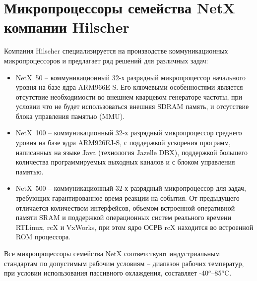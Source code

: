 \documentclass[a4paper,14pt,bachelor]{disser}
\begin{document}
\section{Микропроцессоры семейства NetX компании Hilscher}
Компания Hilscher специализируется на производстве коммуникационных микропроцессоров и предлагает ряд решений для различных задач:
\begin{itemize}
 \item NetX~50 -- коммуникационный 32-х разрядный микропроцессор начального уровня на базе ядра ARM966E-S. Его ключевыми особенностями является отсутствие необходимости во внешнем кварцевом генераторе частоты, при условии что не будет использоваться внешняя SDRAM память, и отсутствие блока управления памятью (MMU).
 \item NetX~100 -- коммуникационный 32-х разрядный микропроцессор среднего уровня на базе ядра ARM926EJ-S, с поддержкой ускорения программ, написанных на языке Java (технология Jazelle DBX), поддержкой большего количества программируемых выходных каналов и с блоком управления памятью.
 \item NetX~500 -- коммуникационный 32-х разрядный микропроцессор для задач, требующих гарантированное время реакции на события. От предыдущего отличается количеством интерфейсов, объемом встроенной оперативной памяти SRAM и поддержкой операционных систем реального времени RTLinux, rcX и VxWorks, при этом ядро ОСРВ rcX находится во встроенной ROM процессора.
\end{itemize}



Все микропроцессоры семейства NetX соответствуют индустриальным стандартам по допустимым рабочим условиям -- диапазон рабочих температур, при условии использования пассивного охлаждения, составляет -40$^o$--85$^o$C.
\end{document}
